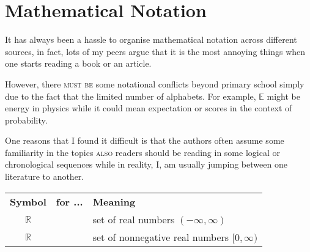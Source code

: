 \newpage
\section{Mathematical Notation}

It has always been a hassle to organise mathematical notation across different sources,
in fact, lots of my peers argue that it is the most annoying things
when one starts reading a book or an article.

However, there \textsc{must be} some notational conflicts beyond primary school
simply due to the fact that the limited number of alphabets.
For example, $\mathbb{E}$ might be energy in physics while it could mean
expectation or scores in the context of probability.

One reasons that I found it difficult is that the authors often assume
some familiarity in the topics \textsc{also} readers should be reading
in some logical or chronological sequences while in reality, I,
am usually jumping between one literature to another.

\begin{table}[h!]
    \centering\renewcommand{\arraystretch}{1.2}
    \begin{tabular}{ccl}
        \textbf{Symbol} & \textbf{for ...} & \textbf{Meaning}                             \\
        $\mathbb{R}$    &                  & set of real numbers $(-\infty,\infty)$       \\
        $\mathbb{R}$    &                  & set of nonnegative real numbers $[0,\infty)$ \\
    \end{tabular}
    \label{tab:real-notation}
\end{table}
\newpage